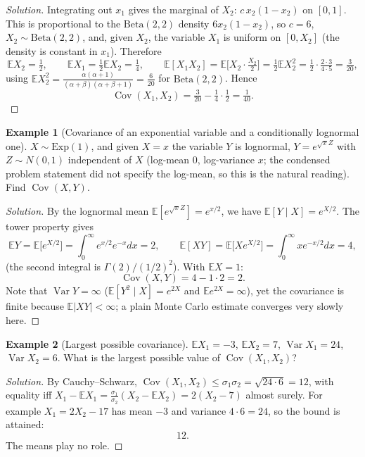 \documentclass[11pt]{article}
\theoremstyle{definition}
\newtheorem{example}{Example}[section]
\newcommand{\E}{\mathbb{E}}
\newcommand{\Var}{\operatorname{Var}}
\newcommand{\Cov}{\operatorname{Cov}}
\begin{document}
\begin{proof}[Solution]
Integrating out $x_1$ gives the marginal of $X_2$: $c\,x_2(1-x_2)$ on $[0,1]$. This is proportional to the $\mathrm{Beta}(2,2)$ density $6x_2(1-x_2)$, so $c=6$, $X_2\sim\mathrm{Beta}(2,2)$, and, given $X_2$, the variable $X_1$ is uniform on $[0,X_2]$ (the density is constant in $x_1$). Therefore
\[
\E X_2=\tfrac12,\qquad\E X_1=\tfrac12\E X_2=\tfrac14,\qquad\E[X_1X_2]=\E\bigl[X_2\cdot\tfrac{X_2}2\bigr]=\tfrac12\E X_2^2=\tfrac12\cdot\tfrac{2\cdot3}{4\cdot5}=\tfrac3{20},
\]
using $\E X_2^2=\tfrac{\alpha(\alpha+1)}{(\alpha+\beta)(\alpha+\beta+1)}=\tfrac{6}{20}$ for $\mathrm{Beta}(2,2)$. Hence
\[
\Cov(X_1,X_2)=\tfrac3{20}-\tfrac14\cdot\tfrac12=\boxed{\tfrac1{40}}.
\]
\end{proof}

\begin{example}[Covariance of an exponential variable and a conditionally lognormal one]
$X\sim\mathrm{Exp}(1)$, and given $X=x$ the variable $Y$ is lognormal, $Y=e^{\sqrt xZ}$ with $Z\sim N(0,1)$ independent of $X$ (log-mean $0$, log-variance $x$; the condensed problem statement did not specify the log-mean, so this is the natural reading). Find $\Cov(X,Y)$.
\end{example}

\begin{proof}[Solution]
By the lognormal mean $\E[e^{\sqrt xZ}]=e^{x/2}$, we have $\E[Y\mid X]=e^{X/2}$. The tower property gives
\[
\E Y=\E\bigl[e^{X/2}\bigr]=\int_0^\infty e^{x/2}e^{-x}dx=2,\qquad
\E[XY]=\E\bigl[Xe^{X/2}\bigr]=\int_0^\infty xe^{-x/2}dx=4,
\]
(the second integral is $\Gamma(2)/(1/2)^2$). With $\E X=1$:
\[
\Cov(X,Y)=4-1\cdot2=\boxed{2}.
\]
Note that $\Var Y=\infty$ ($\E[Y^2\mid X]=e^{2X}$ and $\E e^{2X}=\infty$), yet the covariance is finite because $\E|XY|<\infty$; a plain Monte Carlo estimate converges very slowly here.
\end{proof}

\begin{example}[Largest possible covariance]
$\E X_1=-3$, $\E X_2=7$, $\Var X_1=24$, $\Var X_2=6$. What is the largest possible value of $\Cov(X_1,X_2)$?
\end{example}

\begin{proof}[Solution]
By Cauchy--Schwarz, $\Cov(X_1,X_2)\le\sigma_1\sigma_2=\sqrt{24\cdot6}=12$, with equality iff $X_1-\E X_1=\tfrac{\sigma_1}{\sigma_2}(X_2-\E X_2)=2(X_2-7)$ almost surely. For example $X_1=2X_2-17$ has mean $-3$ and variance $4\cdot6=24$, so the bound is attained:
\[
\boxed{12}.
\]
The means play no role.
\end{proof}
\end{document}
